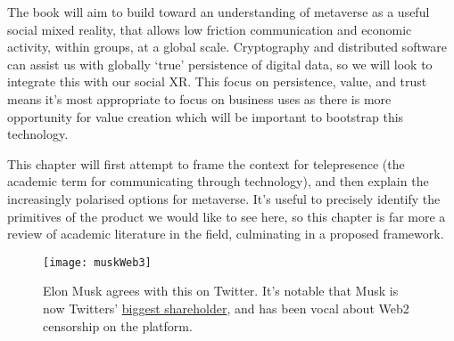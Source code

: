 The book will aim to build toward an understanding of metaverse as a useful social mixed reality, that allows low friction communication and economic activity, within groups, at a global scale. Cryptography and distributed software can assist us with globally `true' persistence of digital data, so we will look to integrate this with our social XR.  This focus on persistence, value, and trust means it's most appropriate to focus on business uses as there is more opportunity for value creation which will be important to bootstrap this technology.\par
This chapter will first attempt to frame the context for telepresence (the academic term for communicating through technology), and then explain the increasingly polarised options for metaverse. It's useful to precisely identify the primitives of the product we would like to see here, so this chapter is far more a review of academic literature in the field, culminating in a proposed framework.\par
\begin{figure}
  \centering
    \texttt{[image: muskWeb3]}
  \caption{Elon Musk agrees with this on Twitter. It's notable that Musk is now Twitters' \href{https://twitter.com/paraga/status/1511320953598357505}{biggest shareholder}, and has been vocal about Web2 censorship on the platform.}
  \label{fig:muskWeb3}
\end{figure}
    
